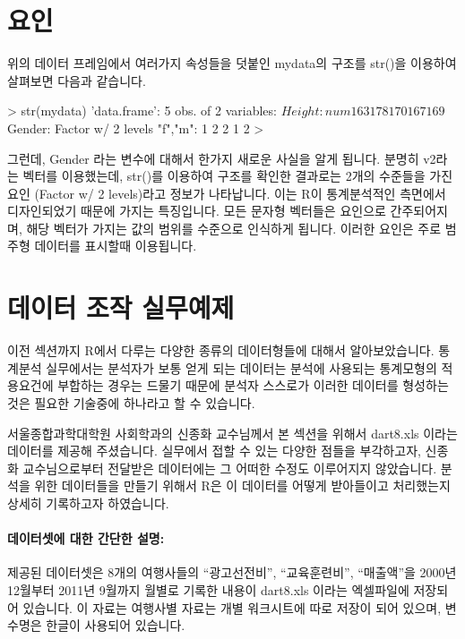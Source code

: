 \section{요인}

위의 데이터 프레임에서 여러가지 속성들을 덧붙인 mydata의 구조를 str()을 이용하여 살펴보면 다음과 같습니다.

\begin{Schunk}
\begin{Soutput}
> str(mydata)
'data.frame':	5 obs. of  2 variables:
 $ Height: num  163 178 170 167 169
 $ Gender: Factor w/ 2 levels "f","m": 1 2 2 1 2
> 
\end{Soutput}
\end{Schunk}

그런데, Gender 라는 변수에 대해서 한가지 새로운 사실을 알게 됩니다. 
분명히 v2라는 벡터를 이용했는데, str()를 이용하여 구조를 확인한 결과로는 2개의 수준들을 가진 요인 (Factor w/ 2 levels)라고 정보가 나타납니다.
이는 R이 통계분석적인 측면에서 디자인되었기 때문에 가지는 특징입니다.
모든 문자형 벡터들은 요인으로 간주되어지며, 해당 벡터가 가지는 값의 범위를 수준으로 인식하게 됩니다.
이러한 요인은 주로 범주형 데이터를 표시할때 이용됩니다.



%
%

\section{데이터 조작 실무예제}

이전 섹션까지 R에서 다루는 다양한 종류의 데이터형들에 대해서 알아보았습니다.
통계분석 실무에서는 분석자가 보통 얻게 되는 데이터는 분석에 사용되는 통계모형의 적용요건에 부합하는 경우는 드물기 때문에 분석자 스스로가 이러한 데이터를 형성하는 것은 필요한 기술중에 하나라고 할 수 있습니다.

서울종합과학대학원 사회학과의 신종화 교수님께서 본 섹션을 위해서 dart8.xls 이라는 데이터를 제공해 주셨습니다. 
실무에서 접할 수 있는 다양한 점들을 부각하고자, 신종화 교수님으로부터 전달받은 데이터에는 그 어떠한 수정도 이루어지지 않았습니다.
분석을 위한 데이터들을 만들기 위해서 R은 이 데이터를 어떻게 받아들이고 처리했는지 상세히 기록하고자 하였습니다.

\paragraph{데이터셋에 대한 간단한 설명:}  
제공된 데이터셋은 8개의 여행사들의 ``광고선전비'', ``교육훈련비'', ``매출액''을 2000년 12월부터 2011년 9월까지 월별로 기록한 내용이 dart8.xls 이라는 엑셀파일에 저장되어 있습니다. 
이 자료는 여행사별 자료는 개별 워크시트에 따로 저장이 되어 있으며, 변수명은 한글이 사용되어 있습니다.

